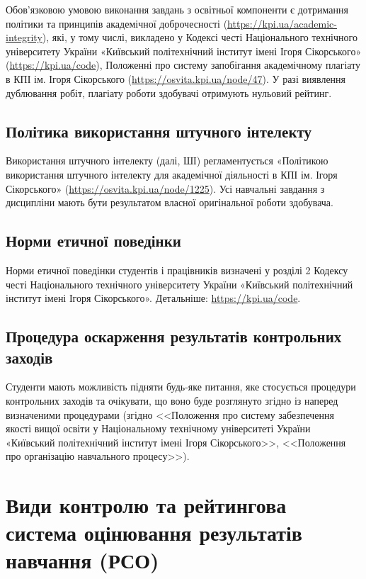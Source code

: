 \documentclass{Syllabus}
\begin{document}
Обов’язковою умовою виконання завдань з освітньої компоненти є дотримання політики та принципів академічної доброчесності (\url{https://kpi.ua/academic-integrity}), які, у тому числі, викладено у Кодексі честі Національного технічного університету України «Київський політехнічний інститут імені Ігоря Сікорського» (\url{https://kpi.ua/code}), Положенні про систему запобігання академічному плагіату в КПІ ім. Ігоря Сікорського (\url{https://osvita.kpi.ua/node/47}). У разі виявлення дублювання робіт, плагіату роботи здобувачі отримують нульовий рейтинг.

\subsection*{Політика використання штучного інтелекту}

Використання штучного інтелекту (далі, ШІ) регламентується «Політикою використання штучного інтелекту для академічної діяльності в КПІ ім. Ігоря Сікорського» (\url{https://osvita.kpi.ua/node/1225}). Усі навчальні завдання з дисципліни мають бути результатом власної оригінальної роботи здобувача.

\subsection*{Норми етичної поведінки}

Норми етичної поведінки студентів і працівників визначені у розділі 2 Кодексу честі Національного технічного університету України «Київський політехнічний інститут імені Ігоря Сікорського». Детальніше: \url{https://kpi.ua/code}.

\subsection*{Процедура оскарження результатів контрольних заходів}

Студенти мають можливість підняти будь-яке питання, яке стосується процедури контрольних заходів та очікувати, що воно буде розглянуто згідно із наперед визначеними процедурами (згідно <<Положення про систему забезпечення якості вищої освіти у Національному технічному університеті України «Київський політехнічний інститут імені Ігоря Сікорського>>, <<Положення про організацію навчального процесу>>).

\section{Види контролю та рейтингова система оцінювання результатів навчання (РСО)}
\end{document}
